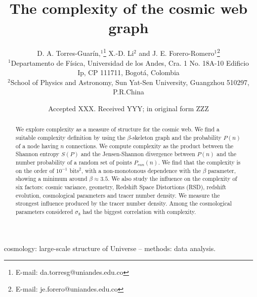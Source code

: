 \documentclass[fleqn,usenatbib]{mnras}
\title[Cosmic Web Graph Complexity]{The complexity of the cosmic web graph}
\author[Torres-Guar\'in et al.]{
D. A. Torres-Guar\'in,$^{1}$\thanks{E-mail:
  da.torresg@uniandes.edu.co} 
X.-D. Li$^{2}$
and J. E. Forero-Romero$^{1}$\thanks{E-mail:
  je.forero@uniandes.edu.co} 
\\
$^{1}$Departamento de F\'isica, Universidad de los Andes, Cra. 1
No. 18A-10 Edificio Ip, CP 111711, Bogot\'a, Colombia\\ 
$^{2}$School of Physics and Astronomy, Sun Yat-Sen University,
Guangzhou 510297, P.R.China\\ 
}
\date{Accepted XXX. Received YYY; in original form ZZZ}
\begin{document}
\label{firstpage}
\pagerange{\pageref{firstpage}--\pageref{lastpage}}
\maketitle

\begin{abstract}
We explore complexity as a measure of structure for the cosmic web. 
We find a suitable complexity definition by using the $\beta$-skeleton graph and
the probability $P(n)$ of a node having $n$ connections. 
We compute complexity as the product between the Shannon entropy
$S(P)$ and the Jensen-Shannon divergence  between $P(n)$ and the number
probability of a random set of points $P_{ran}(n)$. 
We find that the complexity is on the order of $10^{-1}$ bits$^2$,
with a non-monotonous dependence with the $\beta$ parameter, showing
a minimum around $\beta\approx3.5$.
We also study the influence on the  complexity of six factors:  cosmic
variance, geometry, Redshift Space Distortions (RSD), redshift
evolution, cosmological parameters and tracer number density. 
We measure the strongest influence produced by the tracer number density.
Among the cosmological parameters considered $\sigma_{8}$ had the
biggest correlation with complexity.  

\end{abstract}
\begin{keywords}
cosmology: large-scale structure of Universe -- methods: data analysis.
\end{keywords}


\end{document}

